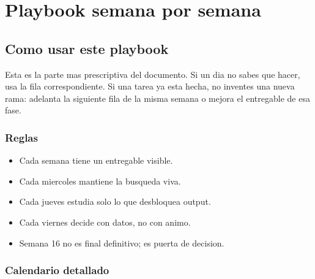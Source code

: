 \chapter{Playbook semana por semana}

\section{Como usar este playbook}


Esta es la parte mas prescriptiva del documento. Si un dia no sabes que hacer, usa la fila correspondiente. Si una tarea ya esta hecha, no inventes una nueva rama: adelanta la siguiente fila de la misma semana o mejora el entregable de esa fase.


\subsection{Reglas}


\begin{itemize}
\item Cada semana tiene un entregable visible.
\item Cada miercoles mantiene la busqueda viva.
\item Cada jueves estudia solo lo que desbloquea output.
\item Cada viernes decide con datos, no con animo.
\item Semana 16 no es final definitivo; es puerta de decision.
\end{itemize}


\subsection{Calendario detallado}


